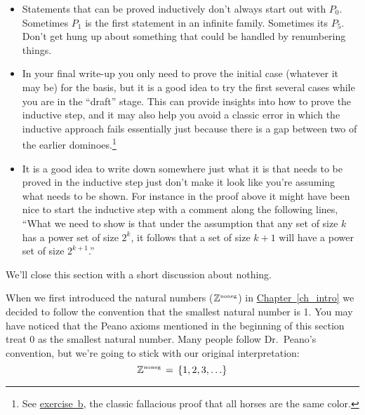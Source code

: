 \documentclass[10pt,]{book}
\theoremstyle{plain}
\theoremstyle{definition}
\theoremstyle{definition}
\numberwithin{equation}{section}
\renewcommand{\Naturals}{{\mathbb Z}^{\mbox{\tiny noneg}} }
\newcommand{\Naturals}{{\mathbb N}}
\begin{document}
  \leavevmode%
\begin{itemize}[label=\textbullet]
\item{}
        Statements that can be proved inductively don't always start out with 
        \(P_0\).  Sometimes \(P_1\) is the first statement in an infinite family.
        Sometimes its \(P_5\).  Don't get hung up about something that could be
        handled by renumbering things.
\item{}
        In your final write-up you only need to prove the initial case
        (whatever it may be) for the basis, but it is a good idea to try 
        the first several cases while you are in the ``draft'' stage.  This
        can provide insights into how to prove the inductive step, and it may
        also help you avoid a classic error in which the inductive approach fails
        essentially just because there is a gap between two of the earlier 
        dominoes.\footnote{See \hyperlink{ex_horses}{exercise~b}, the classic fallacious proof that all horses are the same color.\label{fn-31}}
\item{}
        It is a good idea to write down somewhere just what it is that
        needs to be proved in the inductive step \textemdash{} just don't make it look like 
        you're assuming what needs to be shown.  For instance in the proof above
        it might have been nice to start the inductive step with a comment along
        the following lines, ``What we need to show is that under the assumption
        that any set of size \(k\) has a power set of size \(2^k\), it follows that
        a set of size \(k+1\) will have a power set of size \(2^{k+1}\).''
\end{itemize}

\par

    We'll close this section with a short discussion about nothing.
\par

    When we first introduced the natural numbers (\(\Naturals\)) in \hyperref[ch_intro]{Chapter~\ref{ch_intro}} we decided to follow the convention that the smallest natural number is 1.
    You may have noticed that the Peano axioms mentioned in the beginning of this
    section treat \(0\) as the smallest natural number. Many people follow Dr.~Peano's
    convention, but we're going to stick with our original interpretation:
    \begin{equation*}
      \Naturals \, = \, \{ 1, 2, 3, \ldots \}
    \end{equation*}
\par
\end{document}
